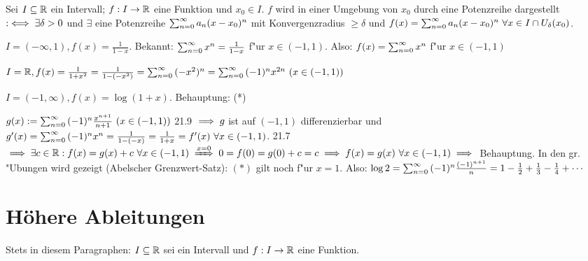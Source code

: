 \documentclass[a4paper,twoside,DIV15,BCOR12mm]{scrbook}
\begin{document}
\begin{definition}
Sei $I \subseteq \mathbb{R}$ ein Intervall; $f:I\to\mathbb{R}$ eine Funktion und $x_0\in I$. $f$ wird in einer Umgebung von $x_0$ durch eine Potenzreihe dargestellt $:\iff \exists \delta>0$ und $\exists$ eine Potenzreihe $\sum_{n=0}^{\infty}{a_n(x-x_0)^n}$ mit Konvergenzradius $\ge \delta$ und $f(x)=\sum_{n=0}^{\infty}{a_n(x-x_0)^n}\ \forall x \in I \cap U_{\delta}(x_0)$.
\end{definition}

\begin{beispiele}
\item $I=(-\infty, 1), f(x)=\frac{1}{1-x}.$ Bekannt: $\sum_{n=0}^{\infty}{x^n}=\frac{1}{1-x}$ f"ur $x \in (-1, 1)$. Also: $f(x)=\sum_{n=0}^{\infty}{x^n}$ f"ur $x \in (-1, 1)$
\item $I=\MdR, f(x)=\frac{1}{1+x^2}=\frac{1}{1-(-x^2)}=\reihenull{(-x^2)^n}=\reihenull{(-1)^nx^{2n}}\ (x\in(-1, 1))$
\item $I=(-1, \infty), f(x)=\log(1+x).$ Behauptung: (*) \\
\begin{beweis}
$g(x):=\sum_{n=0}^{\infty}{(-1)^n\frac{x^{n+1}}{n+1}}\ (x \in (-1, 1))$ 21.9 $\implies g$ ist auf $(-1, 1)$ differenzierbar und $g'(x)=\reihenull{(-1)^nx^n}=\frac{1}{1-(-x)}=\frac{1}{1+x}=f'(x)\ \forall x \in (-1, 1)$. 21.7 $\folgt \exists c \in \MdR: f(x)=g(x)+c\ \forall x \in (-1, 1) \folgtwegen{x=0}0=f(0)=g(0)+c=c\folgt f(x)=g(x)\ \forall x \in (-1, 1) \folgt$ Behauptung.
In den gr. "Ubungen wird gezeigt (Abelscher Grenzwert-Satz): $(*)$ gilt noch f"ur $x=1$. Also: $\log 2=\sum_{n=0}^{\infty}{(-1)^n\frac{(-1)^{n+1}}{n}}=1-\frac{1}{2}+\frac{1}{3}-\frac{1}{4}+\cdots$
\end{beweis}
\end{beispiele}


\chapter{Höhere Ableitungen}

Stets in diesem Paragraphen: $I \subseteq \mathbb{R}$ sei ein Intervall und $f: I \to \mathbb{R}$ eine Funktion.
\end{document}
